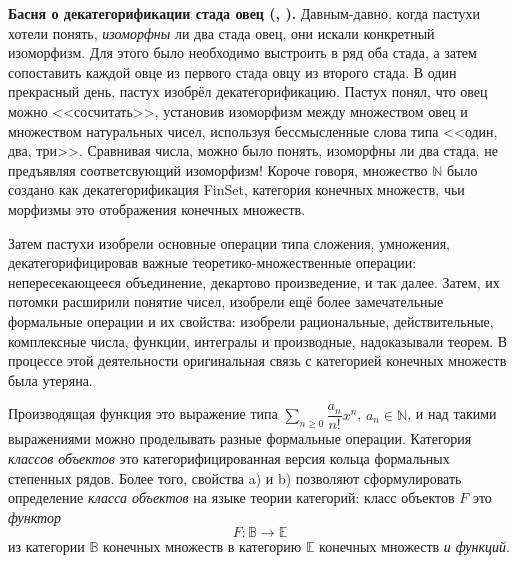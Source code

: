 \documentclass[a5paper]{article}
\theoremstyle{definition}
\begin{document}
\textbf{Басня о декатегорификации стада овец (\cite{category_feynman},
\cite[Remark 6, page 11]{species}).}
Давным-давно, когда пастухи хотели понять, \textit{изоморфны} ли два стада овец,
они искали конкретный изоморфизм. Для этого было необходимо выстроить в ряд оба
стада, а затем сопоставить каждой овце из первого стада овцу из второго стада.
В один прекрасный день, пастух изобрёл декатегорификацию. Пастух понял, что овец
можно <<сосчитать>>, установив изоморфизм между множеством овец и множеством
натуральных чисел, используя бессмысленные слова типа <<один, два, три>>.
Сравнивая числа, можно было понять, изоморфны ли два стада, не предъявляя
соответсвующий изоморфизм! Короче говоря, множество \( \mathbb N \) было создано
как декатегорификация FinSet, категория конечных множеств, чьи морфизмы это
отображения конечных множеств.

Затем пастухи изобрели основные операции типа сложения, умножения,
декатегорифицировав важные теоретико-множественные операции: непересекающееся
объединение, декартово произведение, и так далее. Затем, их потомки расширили
понятие чисел, изобрели ещё более замечательные формальные операции и их
свойства: изобрели рациональные, действительные, комплексные числа, функции,
интегралы и производные, надоказывали теорем. В процессе этой деятельности
оригинальная связь с категорией конечных множеств была утеряна.

Производящая функция это выражение типа \( \sum_{n \geq 0} \dfrac{a_n}{n!} x^n
\), \( a_n \in \mathbb N \), и над такими выражениями можно проделывать разные
формальные операции. Категория \textit{классов объектов} это
категорифицированная версия кольца формальных степенных рядов. Более того,
свойства a) и b) позволяют сформулировать определение \textit{класса объектов}
на языке теории категорий: класс объектов \( F \) это \textit{функтор}
\[
    F \colon \mathbb B \to \mathbb E
\] 
из категории \( \mathbb B \) конечных множеств в категорию \( \mathbb E \)
конечных множеств \textit{и функций}.
\end{document}
